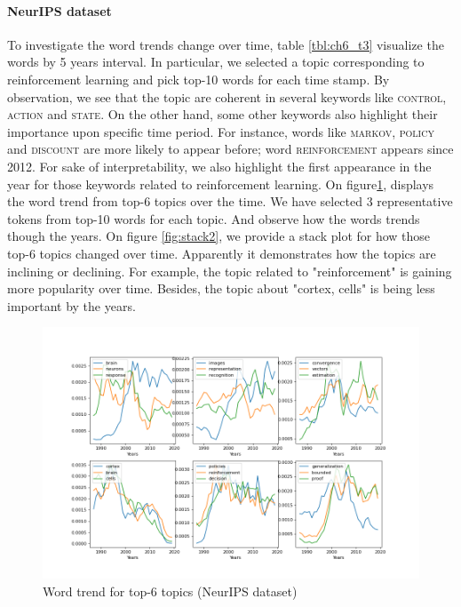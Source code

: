 \paragraph{NeurIPS dataset} %
To investigate the word trends change over time, table \ref{tbl:ch6_t3} visualize the words by 5 years interval. In particular, we selected a topic corresponding to reinforcement learning and pick top-10 words for each time stamp. By observation, we see that the topic are coherent in several keywords like \textsc{control}, \textsc{action} and \textsc{state}. On the other hand, some other keywords also highlight their importance upon specific time period. For instance, words like \textsc{markov}, \textsc{policy} and \textsc{discount} are more likely to appear before; word \textsc{reinforcement} appears since 2012. For sake of interpretability, we also highlight the first appearance in the year for those keywords related to reinforcement learning.
On figure\ref{fig:scatter2}, displays the word trend from top-6 topics over the time. We have selected 3 representative tokens from top-10 words for each topic. And observe how the words trends though the years.
On figure \ref{fig:stack2}, we provide a stack plot for how those top-6 topics changed over time. Apparently it demonstrates how the topics are inclining or declining. For example, the topic related to "reinforcement" is gaining more popularity over time. Besides, the topic about "cortex, cells" is being less important by the years.
\begin{figure}[h]
\centering
\includegraphics[width=1\linewidth]{figures/1128/scatter(2)}
\caption{Word trend for top-6 topics (NeurIPS dataset)}
\label{fig:scatter2}
\end{figure}
